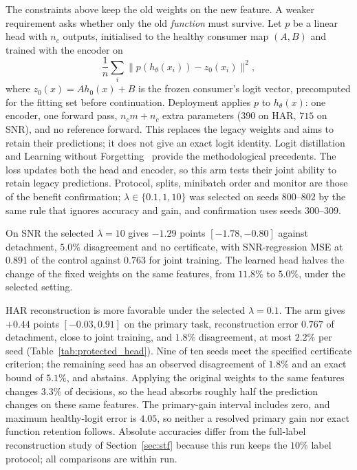 \documentclass{article}
\begin{document}
The constraints above keep the old weights on the new feature. A weaker
requirement asks whether only the old \emph{function} must survive. Let $p$ be
a linear head with $n_c$ outputs, initialised to the healthy consumer map
$(A,B)$ and trained with the encoder on
\begin{equation}
 \frac1n\sum_i\bigl\lVert p(h_\theta(x_i))-z_0(x_i)\bigr\rVert^2,
 \label{eq:protected_head}
\end{equation}
where $z_0(x)=Ah_0(x)+B$ is the frozen consumer's logit vector, precomputed for
the fitting set before continuation. Deployment applies $p$ to $h_\theta(x)$:
one encoder, one forward pass, $n_cm+n_c$ extra parameters ($390$ on HAR,
$715$ on SNR), and no reference
forward. This replaces the legacy weights and aims to retain their predictions;
it does not give an exact logit identity. Logit distillation~\citep{hinton2015distilling}
and Learning without Forgetting~\citep{li2016lwf} provide the methodological
precedents. The loss updates both the head and encoder, so this arm tests their
joint ability to retain legacy predictions. Protocol, splits, minibatch order and
monitor are those of the benefit confirmation; $\lambda\in\{0.1,1,10\}$ was
selected on seeds $800$--$802$ by the same rule that ignores accuracy and gain,
and confirmation uses seeds $300$--$309$.



On SNR the selected $\lambda=10$ gives $-1.29$ points $[-1.78,-0.80]$ against
detachment, $5.0\%$ disagreement and no certificate, with SNR-regression MSE
at $0.891$ of the control against $0.763$ for joint training. The learned head
halves the change of the fixed weights on the same features, from $11.8\%$ to
$5.0\%$, under the selected setting.

HAR reconstruction is more favorable under the selected $\lambda=0.1$. The arm gives
$+0.44$ points $[-0.03,0.91]$ on the primary task, reconstruction error $0.767$
of detachment, close to joint training, and $1.8\%$ disagreement, at most
$2.2\%$ per seed (Table~\ref{tab:protected_head}). Nine of ten seeds meet the
specified certificate criterion; the remaining seed has an observed
disagreement of $1.8\%$ and an exact bound of $5.1\%$, and abstains. Applying
the original
weights to the same features changes $3.3\%$ of decisions, so the head absorbs
roughly half the prediction changes on these same features. The primary-gain interval includes zero, and maximum healthy-logit error is $4.05$, so neither a resolved primary gain nor exact function retention follows. Absolute accuracies
differ from the full-label reconstruction study of Section~\ref{sec:stf}
because this run keeps the $10\%$ label protocol; all comparisons are within
run.
\end{document}
